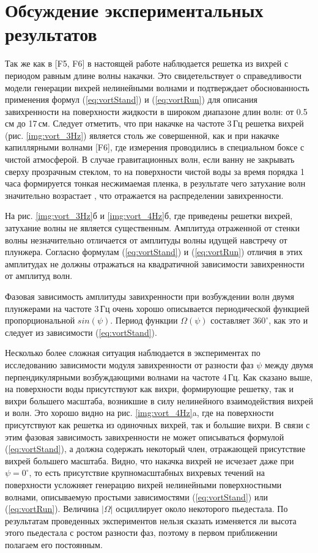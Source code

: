 \section{Обсуждение экспериментальных результатов} \label{sect4_4}
Так же как в [F5, F6] в настоящей работе наблюдается решетка из вихрей с периодом равным длине волны накачки. Это свидетельствует о справедливости модели генерации вихрей нелинейными волнами и подтверждает обоснованность применения формул (\ref{eq:vortStand}) и (\ref{eq:vortRun}) для описания завихренности на поверхности жидкости в широком диапазоне длин волн: от 0.5\,см до 17\,см. Следует отметить, что при накачке на частоте 3\,Гц решетка вихрей (рис. \ref{img:vort_3Hz}) является столь же совершенной, как и при накачке капиллярными волнами [F6], где измерения проводились в специальном боксе с чистой атмосферой. В случае гравитационных волн, если ванну не закрывать сверху прозрачным стеклом, то на поверхности чистой воды за время порядка 1 часа формируется тонкая несжимаемая пленка, в результате чего затухание волн значительно возрастает \cite{land}, что отражается на распределении завихренности.

На рис. \ref{img:vort_3Hz}б и \ref{img:vort_4Hz}б, где приведены решетки вихрей, затухание волны не является существенным. Амплитуда отраженной от стенки волны незначительно отличается от амплитуды волны идущей навстречу от плунжера. Согласно формулам (\ref{eq:vortStand}) и (\ref{eq:vortRun}) отличия в этих амплитудах не должны отражаться на квадратичной зависимости завихренности от амплитуд волн. 

Фазовая зависимость амплитуды завихренности при возбуждении волн двумя плунжерами на частоте 3\,Гц очень хорошо описывается периодической функцией пропорциональной $sin(\psi)$. Период функции $\Omega (\psi)$ составляет $360^\circ$, как это и следует из зависимости (\ref{eq:vortStand}). 

Несколько более сложная ситуация наблюдается в экспериментах по исследованию зависимости модуля завихренности от разности фаз $\psi$ между двумя перпендикулярными возбуждающими волнами на частоте 4\,Гц. Как сказано выше, на поверхности воды присутствуют как вихри, формирующие решетку, так и вихри большего масштаба, возникшие в силу нелинейного взаимодействия вихрей и волн. Это хорошо видно на рис. \ref{img:vort_4Hz}a, где на поверхности присутствуют как решетка из одиночных вихрей, так и большие вихри. В связи с этим фазовая зависимость завихренности не может описываться формулой (\ref{eq:vortStand}), а должна содержать некоторый член, отражающей присутствие вихрей большего масштаба. Видно, что накачка вихрей не исчезает даже при $\psi=0^\circ$, то есть присутствие крупномасштабных вихревых течений на поверхности усложняет генерацию вихрей нелинейными поверхностными волнами, описываемую простыми зависимостями (\ref{eq:vortStand}) или (\ref{eq:vortRun}). Величина $|\Omega|$ осциллирует около некоторого пьедестала. По результатам проведенных экспериментов нельзя сказать изменяется ли высота этого пьедестала с ростом разности фаз, поэтому в первом приближении полагаем его постоянным. 

